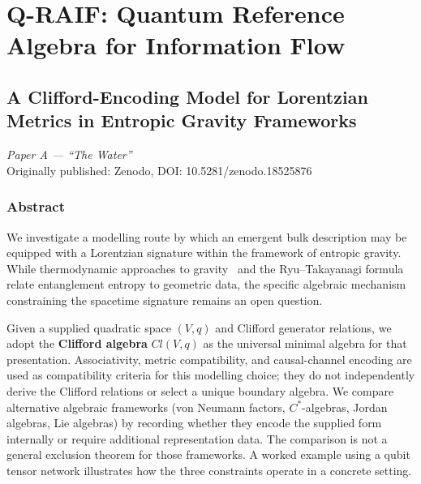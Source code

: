 \documentclass[12pt,a4paper,openany]{book}
\begin{document}
\part{Q-RAIF: Quantum Reference Algebra for Information Flow}
\label{part:QRAIF}

\chapter{A Clifford-Encoding Model for Lorentzian Metrics in Entropic Gravity Frameworks}
\label{Q-chap:paperA}

\begin{center}
\textit{Paper A --- ``The Water''}\\[0.5em]
Originally published: Zenodo, DOI: 10.5281/zenodo.18525876
\end{center}

\bigskip

\section*{Abstract}
We investigate a modelling route by which an emergent bulk description may be equipped with a Lorentzian signature within the framework of entropic gravity.
While thermodynamic approaches to gravity~\cite{Jacobson1995,Verlinde2011} and the Ryu--Takayanagi formula~\cite{RyuTakayanagi2006} relate entanglement entropy to geometric data, the specific algebraic mechanism constraining the spacetime signature remains an open question.

Given a supplied quadratic space $(V,q)$ and Clifford generator relations, we adopt the \textbf{Clifford algebra} $Cl(V,q)$ as the universal minimal algebra for that presentation.  Associativity, metric compatibility, and causal-channel encoding are used as compatibility criteria for this modelling choice; they do not independently derive the Clifford relations or select a unique boundary algebra.
We compare alternative algebraic frameworks (von Neumann factors, $C^*$-algebras, Jordan algebras, Lie algebras) by recording whether they encode the supplied form internally or require additional representation data.  The comparison is not a general exclusion theorem for those frameworks.
A worked example using a qubit tensor network illustrates how the three constraints operate in a concrete setting.
\end{document}
